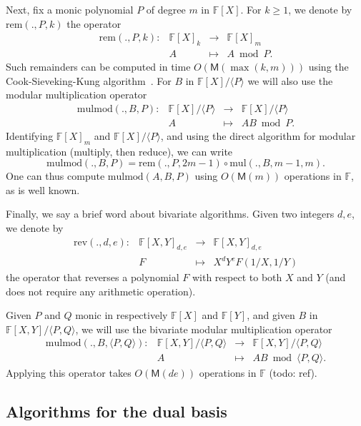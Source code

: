 \documentclass[12pt]{article}
\def\M {\ensuremath{\mathsf{M}}}
\def\F {\ensuremath{\mathbb{F}}}
\def\mul {\ensuremath{\mathrm{mul}}}
\def\rem {\ensuremath{\mathrm{rem}}}
\def\mulmod {\ensuremath{\mathrm{mulmod}}}
\def\rev {\ensuremath{\mathrm{rev}}}
\begin{document}
Next, fix a monic polynomial $P$ of degree $m$ in $\F[X]$. For $k \ge 1$, we denote by
$\rem(.,P,k)$ the operator
$$
\begin{array}{cccc}
\rem(.,P,k): &\F[X]_k& \to &\F[X]_{m}\\
& A & \mapsto & A \bmod P.
\end{array}$$ 
Such remainders can be computed in time $O(\M(\max(k,m)))$ using the
Cook-Sieveking-Kung algorithm~\cite[Chapter~9]{vzGG}. For $B$
in $\F[X]/\langle P \rangle$ we will also use the modular multiplication
operator
$$\begin{array}{cccc} \mulmod(.,B,P): & \F[X]/\langle P \rangle & \to
  & \F[X]/\langle P \rangle\\ & A & \mapsto & AB \bmod P.
\end{array}$$ 
Identifying $\F[X]_m$ and $\F[X]/\langle P \rangle$, and using the
direct algorithm for modular multiplication (multiply, then reduce),
we can write 
\begin{equation}
  \label{eq:mulmod}
  \mulmod(.,B,P) = \rem(.,P,2m-1) \circ \mul(.,B,m-1,m).
\end{equation}
One can thus compute $\mulmod(A,B,P)$ using $O(\M(m))$ operations in
$\F$, as is well known.

Finally, we say a brief word about bivariate algorithms.  Given two
integers $d,e$, we denote by
$$
\begin{array}{cccc}
\rev(.,d,e): &\F[X,Y]_{d,e} &\to& \F[X,Y]_{d,e}  \\
& F & \mapsto & X^d Y^e F(1/X,1/Y)
\end{array}$$
the operator that reverses a polynomial $F$ with respect to both $X$
and $Y$ (and does not require any arithmetic operation).

Given $P$ and $Q$ monic in respectively $\F[X]$ and $\F[Y]$, 
and given $B$ in $\F[X,Y]/\langle P,Q\rangle$, we will use the
bivariate modular multiplication operator
$$\begin{array}{cccc} \mulmod(.,B,\langle P,Q \rangle): & \F[X,Y]/\langle P,Q \rangle & \to
  & \F[X,Y]/\langle P,Q \rangle\\ & A & \mapsto & AB \bmod \langle P, Q \rangle.
\end{array}$$ 
Applying this operator takes $O(\M(de))$ operations in $\F$ (todo: ref).


\subsection{Algorithms for the dual basis}
\end{document}
